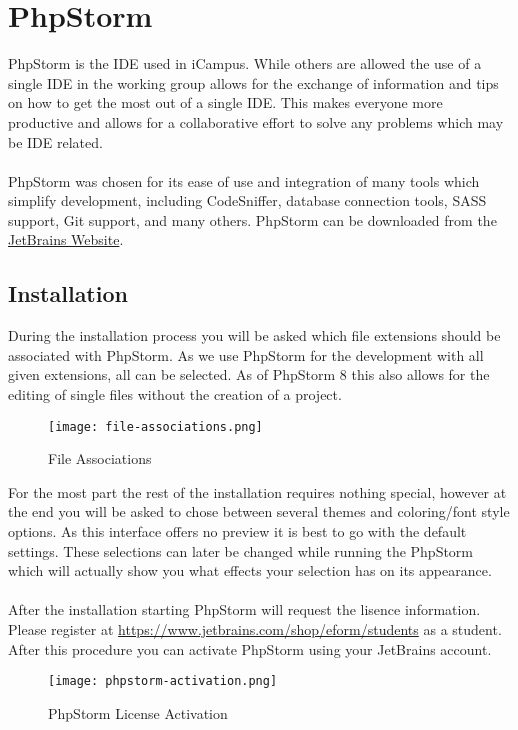 \section{PhpStorm}
\label{sec:PHP-Storm}

PhpStorm is the IDE used in iCampus. While others are allowed the use of a single IDE in the working group allows for the exchange of information and tips on how to get the most out of a single IDE. This makes everyone more productive and allows for a collaborative effort to solve any problems which may be IDE related.\\
\\
PhpStorm was chosen for its ease of use and integration of many tools which simplify development, including CodeSniffer, database connection tools, SASS support, Git support, and many others. PhpStorm can be downloaded from the \href{http://www.jetbrains.com/phpstorm/}{JetBrains Website}.

\subsection{Installation}
During the installation process you will be asked which file extensions should be associated with PhpStorm. As we use PhpStorm for the development with all given extensions, all can be selected. As of PhpStorm 8 this also allows for the editing of single files without the creation of a project.

\begin{figure}[h] 
	\centering
	\vspace{3pt}
	\texttt{[image: file-associations.png]}
	\caption{File Associations}
\end{figure}

\noindent
For the most part the rest of the installation requires nothing special, however at the end you will be asked to chose between several themes and coloring/font style options. As this interface offers no preview it is best to go with the default settings. These selections can later be changed while running the PhpStorm which will actually show you what effects your selection has on its appearance.\\
\\
After the installation starting PhpStorm will request the lisence information. Please register at \url{https://www.jetbrains.com/shop/eform/students} as a student. After this procedure you can activate PhpStorm using your JetBrains account.

\begin{figure}[h]
	\centering
	\vspace{3pt}
	\texttt{[image: phpstorm-activation.png]}
	\caption{PhpStorm License Activation}
\end{figure}

